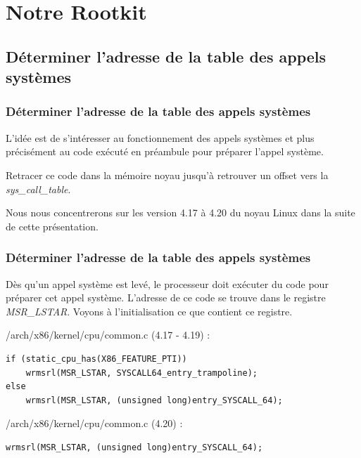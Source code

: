 \documentclass{beamer}
\begin{document}
\section{Notre Rootkit}
\subsection{Déterminer l'adresse de la table des appels systèmes}

\begin{frame}
\frametitle{Déterminer l'adresse de la table des appels systèmes}
L'idée est de s'intéresser au fonctionnement des appels systèmes et plus précisément au code exécuté en préambule pour préparer l'appel système.

\medskip
Retracer ce code dans la mémoire noyau jusqu'à retrouver un offset vers la \textit{sys\_call\_table}.

\medskip
Nous nous concentrerons sur les version 4.17 à 4.20 du noyau Linux dans la suite de cette présentation.
\end{frame}

\begin{frame}[fragile]
\frametitle{Déterminer l'adresse de la table des appels systèmes}
Dès qu'un appel système est levé, le processeur doit exécuter du code pour préparer cet appel système. L'adresse de ce code se trouve dans le registre \textit{MSR\_LSTAR}. Voyons à l'initialisation ce que contient ce registre.

\medskip
/arch/x86/kernel/cpu/common.c (4.17 - 4.19) :
\begin{lstlisting}[style=CStyle]
if (static_cpu_has(X86_FEATURE_PTI))
	wrmsrl(MSR_LSTAR, SYSCALL64_entry_trampoline);
else
	wrmsrl(MSR_LSTAR, (unsigned long)entry_SYSCALL_64);
\end{lstlisting}

\medskip
/arch/x86/kernel/cpu/common.c (4.20) :
\begin{lstlisting}[style=CStyle]
wrmsrl(MSR_LSTAR, (unsigned long)entry_SYSCALL_64);
\end{lstlisting}
\end{frame}
\end{document}
